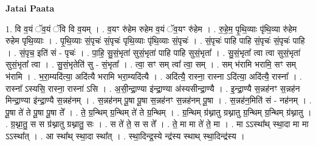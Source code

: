 \documentclass[17pt]{extarticle}
\begin{document}
\textbf{Jatai Paata} \newline

1. वि व॒यं ॅव॒यं ॅवि वि व॒यम् । . व॒यꣳ रु॑हेम रुहेम व॒यं ॅव॒यꣳ रु॑हेम । . रु॒हे॒म॒ पृ॒थि॒व्याः पृ॑थि॒व्या रु॑हेम रुहेम पृथि॒व्याः । . पृ॒थि॒व्याः सं॒पृचः॑ सं॒पृचः॑ पृथि॒व्याः पृ॑थि॒व्याः सं॒पृचः॑ । . सं॒पृचः॑ पाहि पाहि सं॒पृचः॑ सं॒पृचः॑ पाहि । . सं॒पृच॒ इति॑ सं - पृचः॑ । . पा॒हि॒ सु॒सं॒भृता॑ सुसं॒भृता॑ पाहि पाहि सुसं॒भृता᳚ । . सु॒सं॒भृता᳚ त्वा त्वा सुसं॒भृता॑ सुसं॒भृता᳚ त्वा । . सु॒सं॒भृतेति॑ सु - सं॒भृता᳚ । . त्वा॒ सꣳ सम् त्वा᳚ त्वा॒ सम् । . सम् भ॑रामि भरामि॒ सꣳ सम् भ॑रामि । . भ॒रा॒म्यदि॑त्या॒ अदि॑त्यै भरामि भरा॒म्यदि॑त्यै । . अदि॑त्यै॒ रास्ना॒ रास्ना ऽदि॑त्या॒ अदि॑त्यै॒ रास्ना᳚ । . रास्ना᳚ ऽस्यसि॒ रास्ना॒ रास्ना॑ ऽसि । . अ॒सी॒न्द्रा॒ण्या इ॑न्द्रा॒ण्या अ॑स्यसीन्द्रा॒ण्यै । . इ॒न्द्रा॒ण्यै स॒न्नह॑नꣳ स॒न्नह॑न मिन्द्रा॒ण्या इ॑न्द्रा॒ण्यै स॒न्नह॑नम् । . स॒न्नह॑नम् पू॒षा पू॒षा स॒न्नह॑नꣳ स॒न्नह॑नम् पू॒षा । . स॒न्नह॑न॒मिति॑ सं - नह॑नम् । . पू॒षा ते॑ ते पू॒षा पू॒षा ते᳚ । . ते॒ ग्र॒न्थिम् ग्र॒न्थिम् ते॑ ते ग्र॒न्थिम् । . ग्र॒न्थिम् ग्र॑थ्नातु ग्रथ्नातु ग्र॒न्थिम् ग्र॒न्थिम् ग्र॑थ्नातु । . ग्र॒थ्ना॒तु॒ स स ग्र॑थ्नातु ग्रथ्नातु॒ सः । . स ते॑ ते॒ स स ते᳚ । . ते॒ मा मा ते॑ ते॒ मा । . मा ऽऽस्था᳚थ् स्था॒दा मा मा ऽऽस्था᳚त् । . आ स्था᳚थ् स्था॒दा स्था᳚त् । . स्था॒दिन्द्र॒स्ये न्द्र॑स्य स्थाथ् स्था॒दिन्द्र॑स्य । \newline
\end{document}
